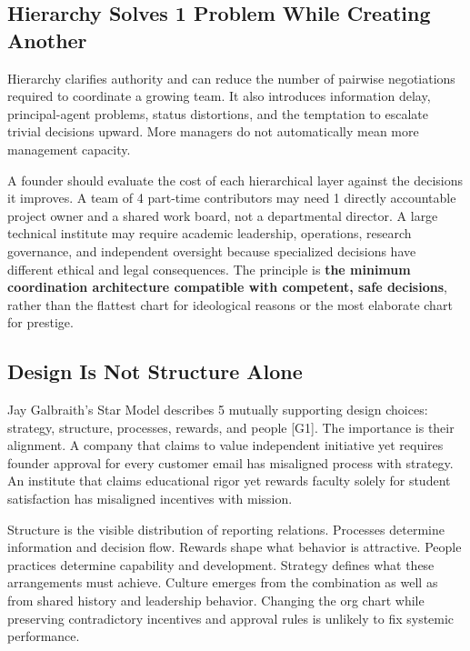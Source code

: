\subsection{Hierarchy Solves 1 Problem While Creating Another}
\label{sec:hierarchy_tradeoffs}

Hierarchy clarifies authority and can reduce the number of pairwise negotiations required to coordinate a growing team. It also introduces information delay, principal-agent problems, status distortions, and the temptation to escalate trivial decisions upward. More managers do not automatically mean more management capacity.

A founder should evaluate the cost of each hierarchical layer against the decisions it improves. A team of 4 part-time contributors may need 1 directly accountable project owner and a shared work board, not a departmental director. A large technical institute may require academic leadership, operations, research governance, and independent oversight because specialized decisions have different ethical and legal consequences. The principle is \textbf{the minimum coordination architecture compatible with competent, safe decisions}, rather than the flattest chart for ideological reasons or the most elaborate chart for prestige.

\subsection{Design Is Not Structure Alone}
\label{sec:design_not_structure_alone}

Jay Galbraith's Star Model describes 5 mutually supporting design choices: strategy, structure, processes, rewards, and people [G1]. The importance is their alignment. A company that claims to value independent initiative yet requires founder approval for every customer email has misaligned process with strategy. An institute that claims educational rigor yet rewards faculty solely for student satisfaction has misaligned incentives with mission.

Structure is the visible distribution of reporting relations. Processes determine information and decision flow. Rewards shape what behavior is attractive. People practices determine capability and development. Strategy defines what these arrangements must achieve. Culture emerges from the combination as well as from shared history and leadership behavior. Changing the org chart while preserving contradictory incentives and approval rules is unlikely to fix systemic performance.

